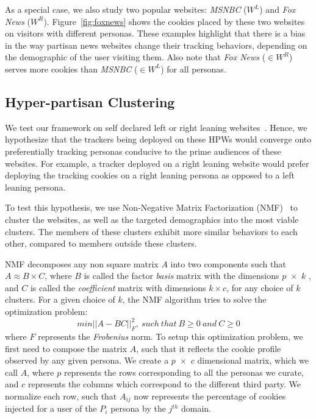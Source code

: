 \documentclass{article}
\newcommand{\hpws}{HPWs\xspace}
\begin{document}
As a special case, we also study two popular websites: \emph{MSNBC} ($W^L$) and \emph{Fox News} ($W^R$).
Figure~\ref{fig:foxnews} shows the cookies placed by these two websites on visitors with different personas.
These examples highlight that there is a bias in the way partisan news websites change their tracking behaviors, depending on the demographic of the user visiting them.
Also note that \emph{Fox News} ($\in W^R$) serves more cookies than \emph{MSNBC} ($\in W^L$) for all personas.



\subsection{Hyper-partisan Clustering}\label{sec:clustering}

We test our framework on self declared left or right leaning websites~\cite{bhatt2018illuminating}.
Hence, we hypothesize that the trackers being deployed on these \hpws would converge onto preferentially tracking personas conducive to the prime audiences of these websites.
For example, a tracker deployed on a right leaning website would prefer deploying the tracking cookies on a right leaning persona as opposed to a left leaning persona. 

To test this hypothesis, we use Non-Negative Matrix Factorization (NMF)~\cite{lee1999learning} to cluster the websites, as well as the targeted demographics into the most viable clusters.
The members of these clusters exhibit more similar behaviors to each other, compared to members outside these clusters. 

NMF decomposes any non square matrix $A$ into two components such that $A \approx B \times C$,
where $B$ is called the factor \emph{basis} matrix with the dimensions $p$~$\times$~$k$ , and $C$ is called the \emph{coefficient} matrix with dimensions $k \times c$, for any choice of $k$ clusters.
For a given choice of $k$, the NMF algorithm tries to solve the optimization problem:
\begin{equation}
min {||A-BC||}_F^2, \ such\  that\  B\geq 0\ and\ C \geq 0
\end{equation}
where $F$ represents the \emph{Frobenius} norm.
To setup this optimization problem, we first need to compose the matrix $A$, such that it reflects the cookie profile observed by any given persona.
We create a $p$~$\times$~$c$ dimensional matrix, which we call $A$, where $p$ represents the rows corresponding to all the personas we curate, and $c$ represents the columns which correspond to the different third party.
We normalize each row, such that $A_{ij}$ now represents the percentage of cookies injected for a user of the $P_i$ persona by the $j^{th}$ domain. 
\end{document}
